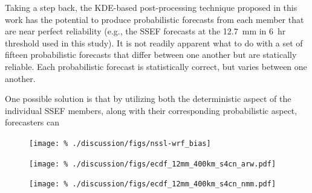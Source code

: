 Taking a step back, the KDE-based post-processing technique proposed in this work has the potential to produce probabilistic forecasts from each member that are near perfect reliability (e.g., the SSEF forecasts at the \mbox{12.7 mm} in \mbox{6 hr} threshold used in this study).
It is not readily apparent what to do with a set of fifteen probabilistic forecasts that differ between one another but are statically reliable.
Each probabilistic forecast is statistically correct, but varies between one another.


One possible solution is that by utilizing both the deterministic aspect of the individual SSEF members, along with their corresponding probabilistic aspect, forecasters can












\clearpage
\begin{figure}[cc]
    \centering
    \texttt{[image: \%
    ./discussion/figs/nssl-wrf\_bias]}\\
    \caption{}
    \label{nssl-wrf_bias}
\end{figure}


\clearpage
\begin{figure}[cc]
    \centering
    \texttt{[image: \%
    ./discussion/figs/ecdf\_12mm\_400km\_s4cn\_arw.pdf]}\\
    \caption{}
    \label{s4cn_arw_ecdf_12mm_400km}
\end{figure}


\begin{figure}[cc]
    \centering
    \texttt{[image: \%
    ./discussion/figs/ecdf\_12mm\_400km\_s4cn\_nmm.pdf]}\\
    \caption{}
    \label{s4cn_nmm_ecdf_12mm_400km}
\end{figure}

